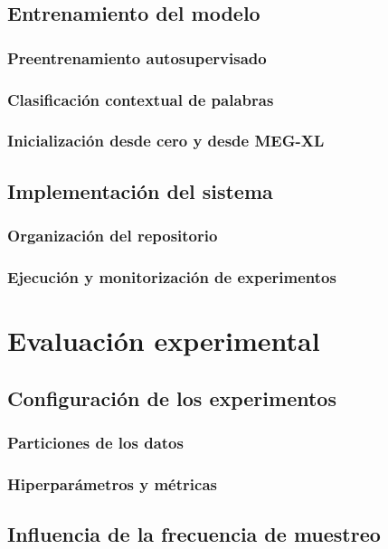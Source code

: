 \documentclass[11pt,spanish,listoffigures,listoftables]{tfgetsinf}
\begin{document}
\section{Entrenamiento del modelo}
\subsection{Preentrenamiento autosupervisado}
\subsection{Clasificación contextual de palabras}
\subsection{Inicialización desde cero y desde MEG-XL}

\section{Implementación del sistema}
\subsection{Organización del repositorio}
\subsection{Ejecución y monitorización de experimentos}


\chapter{Evaluación experimental}

\section{Configuración de los experimentos}
\subsection{Particiones de los datos}
\subsection{Hiperparámetros y métricas}

\section{Influencia de la frecuencia de muestreo}
\end{document}
